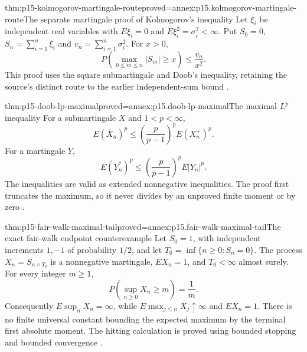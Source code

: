 \begin{hbtheorem}{thm:p15-kolmogorov-martingale-route}{proved=annex:p15.kolmogorov-martingale-route}{The separate martingale proof of Kolmogorov's inequality}
Let \(\xi_i\) be independent real variables with
\(E\xi_i=0\) and \(E\xi_i^2=\sigma_i^2<\infty\).
Put \(S_0=0\), \(S_n=\sum_{i=1}^n\xi_i\) and
\(v_n=\sum_{i=1}^n\sigma_i^2\). For \(x>0\),
\[
               P\left(\max_{0\leq m\leq n}|S_m|\geq x\right)
                                      \leq\frac{v_n}{x^2}.
\]
This proof uses the square submartingale and Doob's inequality,
retaining the source's distinct route to the earlier independent-sum
bound \cite[example~4.4.3, p.~235]{DurrettPTEAuthor2019}.
\end{hbtheorem}

\begin{hbtheorem}{thm:p15-doob-lp-maximal}{proved=annex:p15.doob-lp-maximal}{The maximal \(L^p\) inequality}
For a submartingale \(X\) and \(1<p<\infty\),
\[
                 E(\overline X_n)^p
                    \leq\left(\frac p{p-1}\right)^pE(X_n^+)^p.
\]
For a martingale \(Y\),
\[
                 E(Y_n^*)^p
                    \leq\left(\frac p{p-1}\right)^pE|Y_n|^p.
\]
The inequalities are valid as extended nonnegative inequalities.
The proof first truncates the maximum, so it never divides by an
unproved finite moment or by zero
\cite[thm.~4.4.4]{DurrettPTEAuthor2019}.
\end{hbtheorem}

\begin{hbtheorem}{thm:p15-fair-walk-maximal-tail}{proved=annex:p15.fair-walk-maximal-tail}{The exact fair-walk endpoint counterexample}
Let \(S_0=1\), with independent increments \(1,-1\) of probability
\(1/2\), and let \(T_0=\inf\{n\geq0:S_n=0\}\).
The process \(X_n=S_{n\wedge T_0}\) is a nonnegative martingale,
\(EX_n=1\), and \(T_0<\infty\) almost surely. For every integer \(m\geq1\),
\[
                 P\left(\sup_{n\geq0}X_n\geq m\right)=\frac1m.
\]
Consequently \(E\sup_nX_n=\infty\), while
\(E\max_{j\leq n}X_j\uparrow\infty\) and \(EX_n=1\).
There is no finite universal constant bounding the expected maximum
by the terminal first absolute moment. The hitting calculation is
proved using bounded stopping and bounded convergence
\cite[example~4.4.5, pp.~236--237]{DurrettPTEAuthor2019}.
\end{hbtheorem}


